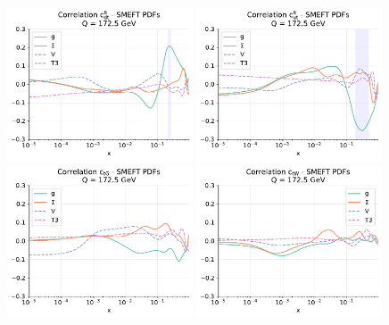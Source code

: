 \documentclass[withindex,glossary]{cam-thesis}
\begin{document}
\begin{figure}[t!]
\centering
\includegraphics[width=0.49\textwidth]{smeft_plots/correlations_fitpdf_plot_bsm_pdf_corr_O8dt.pdf}
\includegraphics[width=0.49\textwidth]{smeft_plots/correlations_fitpdf_plot_bsm_pdf_corr_O8ut.pdf}
\includegraphics[width=0.49\textwidth]{smeft_plots/correlations_fitpdf_plot_bsm_pdf_corr_OtG.pdf}
\includegraphics[width=0.49\textwidth]{smeft_plots/correlations_fitpdf_plot_bsm_pdf_corr_OtW.pdf}

\end{figure}
\end{document}
